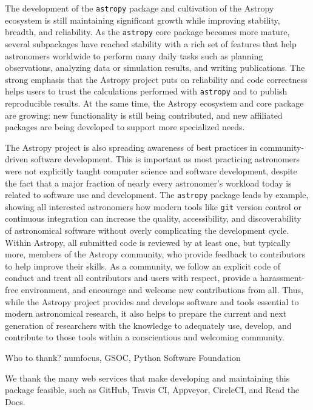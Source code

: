 \documentclass[modern]{aastex61}
\newcommand{\package}[1]{\texttt{#1}\xspace}
\newcommand{\astropy}{Astropy\xspace}
\newcommand{\astropypkg}{\package{astropy}}
\begin{document}
The development of the \astropypkg package and cultivation of the \astropy
ecosystem is still maintaining significant growth while improving stability,
breadth, and reliability.
As the \astropypkg core package becomes more mature, several subpackages have
reached stability with a rich set of features that help astronomers worldwide to
perform many daily tasks such as planning observations, analyzing data or
simulation results, and writing publications.
The strong emphasis that the \astropy project puts on reliability and code
correctness helps users to trust the calculations performed with \astropypkg and
to publish reproducible results.
At the same time, the \astropy ecosystem and core package are growing: new
functionality is still being contributed, and new affiliated packages are being
developed to support more specialized needs.

The \astropy project is also spreading awareness of best practices in
community-driven software development.
This is important as most practicing astronomers were not explicitly taught
computer science and software development, despite the fact that a major
fraction of nearly every astronomer's workload today is related to software use
and development.
The \astropypkg package leads by example, showing all interested astronomers how
modern tools like \texttt{git} version control or continuous integration can
increase the quality, accessibility, and discoverability of astronomical
software without overly complicating the development cycle.
Within \astropy, all submitted code is reviewed by at least one, but typically
more, members of the \astropy community, who provide feedback to contributors
to help improve their skills.
As a community, we follow an explicit code of conduct \citep{ape8} and treat all
contributors and users with respect, provide a harassment-free environment, and
encourage and welcome new contributions from all.
Thus, while the \astropy project provides and develops software and tools
essential to modern astronomical research, it also helps to prepare the current
and next generation of researchers with the knowledge to adequately use,
develop, and contribute to those tools within a conscientious and welcoming
community.

\acknowledgments

Who to thank?  numfocus, GSOC, Python Software Foundation

We thank the many web services that make developing and maintaining this package
feasible, such as GitHub, Travis CI, Appveyor, CircleCI, and Read the Docs.
\end{document}
